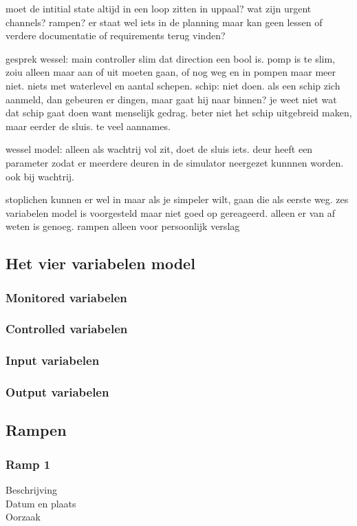 \documentclass{article}
\begin{document}
	moet de intitial state altijd in een loop zitten in uppaal?
	wat zijn urgent channels?
	rampen? er staat wel iets in de planning maar kan geen lessen of verdere documentatie of requirements terug vinden?	
	
	
	gesprek wessel:
	main controller slim dat direction een bool is. 
	pomp is te slim, zoiu alleen maar aan of uit moeten gaan, of nog weg en in pompen maar meer niet. niets met waterlevel en aantal schepen.
	schip: niet doen. als een schip zich aanmeld, dan gebeuren er dingen, maar gaat hij naar binnen? je weet niet wat dat schip gaat doen want menselijk gedrag. beter niet het schip uitgebreid maken, maar eerder de sluis. te veel aannames.
	
	wessel model: alleen als wachtrij vol zit, doet de sluis iets.
	deur heeft een parameter zodat er meerdere deuren in de simulator neergezet kunnnen worden. ook bij wachtrij.
	
	stoplichen kunnen er wel in maar als je simpeler wilt, gaan die als eerste weg.
	zes variabelen model is voorgesteld maar niet goed op gereageerd. alleen er van af weten is genoeg.
	rampen alleen voor persoonlijk verslag
	
	
	\subsection{Het vier variabelen model}
	\subsubsection{Monitored variabelen}
	\subsubsection{Controlled variabelen}
	\subsubsection{Input variabelen}
	\subsubsection{Output variabelen}
	
	\subsection{Rampen}
	
	\subsubsection{Ramp 1}
	\begin{description}
		\item[Beschrijving]
		\item[Datum en plaats] 
		\item[Oorzaak]
	\end{description}
	
\end{document}
